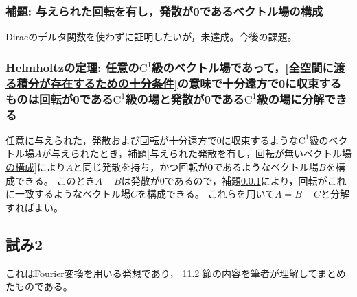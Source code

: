             \subsubsection{補題: 与えられた回転を有し，発散が0であるベクトル場の構成}
                \label{与えられた回転を有し，発散が無いベクトル場の構成}
                Diracのデルタ関数を使わずに証明したいが，未達成。今後の課題。
            \subsubsection{Helmholtzの定理: 任意の\texorpdfstring{$\mathrm{C}^1$}{C\string^1}級のベクトル場であって，\ref{全空間に渡る積分が存在するための十分条件}の意味で十分遠方で0に収束するものは回転が\texorpdfstring{$\bm{0}$}{0}である\texorpdfstring{$\mathrm{C}^1$}{C\string^1}級の場と発散が0である\texorpdfstring{$\mathrm{C}^1$}{C\string^1}級の場に分解できる}
                任意に与えられた，発散および回転が十分遠方で0に収束するような$\mathrm{C}^1$級のベクトル場$A$が与えられたとき，補題\ref{与えられた発散を有し，回転が無いベクトル場の構成}により$A$と同じ発散を持ち，かつ回転が$\bm{0}$であるようなベクトル場$B$を構成できる。
                このとき$A - B$は発散が0であるので，補題\ref{与えられた回転を有し，発散が無いベクトル場の構成}により，回転がこれに一致するようなベクトル場$C$を構成できる。
                これらを用いて$A = B + C$と分解すればよい。
        \subsection{試み2}
            これはFourier変換を用いる発想であり，\cite{qm3_chap5_j} 11.2 節の内容を筆者が理解してまとめたものである。
